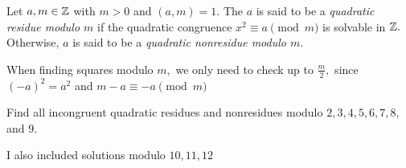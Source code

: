 \documentclass[letterpaper, 11 pt]{ximera}
\theoremstyle{definition}
\begin{document}
\begin{definition}\label{defn:quad-residue}
    Let $a,m\in\mathbb Z$ with $m>0$ and $(a,m)=1.$ The $a$ is said to be a \emph{quadratic residue modulo $m$} if the quadratic congruence $x^2\equiv a\pmod{m}$ is solvable in $\mathbb Z.$ Otherwise, $a$ is said to be a \emph{quadratic nonresidue modulo $m$}.
\end{definition}

\begin{remark}
    When finding squares modulo $m,$ we only need to check up to $\frac{m}{2},$ since $(-a)^2=a^2$ and $m-a\equiv -a\pmod{m}$
\end{remark}

\begin{br}
    Find all incongruent quadratic residues and nonresidues modulo $2,3,4,5,6,7,8,$ and $9$.


    \begin{solution}
        I also included solutions modulo $10,11,12$


\end{solution}
\end{br}
\end{document}
